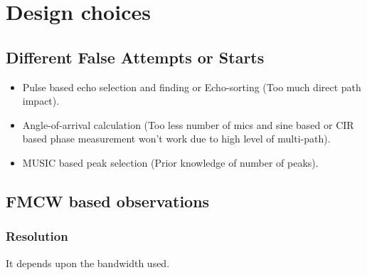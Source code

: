 \section{Design choices}
\label{sec:design}

\subsection{Different False Attempts or Starts}
\begin{itemize}
\item Pulse based echo selection and finding or Echo-sorting (Too much direct path impact).
\item Angle-of-arrival calculation (Too less number of mics and sine based or CIR based phase measurement won't work due to high level of multi-path).
\item MUSIC based peak selection (Prior knowledge of number of peaks).
\end{itemize}

\subsection{FMCW based observations}

\subsubsection{Resolution}
It depends upon the bandwidth used.

\begin{figure}[hbt]

\end{figure}

